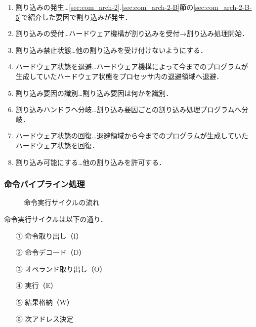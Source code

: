\begin{enumerate}[label=\arabic*., labelsep=10pt, leftmargin=23pt]
	\item 割り込みの発生…\ref{sec:com_arch-2}.\ref{sec:com_arch-2-B}節の\ref{sec:com_arch-2-B-5}で紹介した要因で割り込みが発生．
	\item 割り込みの受付…ハードウェア機構が割り込みを受付→割り込み処理開始．
	\item 割り込み禁止状態…他の割り込みを受け付けないようにする．
	\item ハードウェア状態を退避…ハードウェア機構によって今までのプログラムが生成していたハードウェア状態をプロセッサ内の退避領域へ退避．
	\item 割り込み要因の識別…割り込み要因は何かを識別．
	\item 割り込みハンドラへ分岐…割り込み要因ごとの割り込み処理プログラムへ分岐．
	\item ハードウェア状態の回復…退避領域から今までのプログラムが生成していたハードウェア状態を回復．
	\item 割り込み可能にする…他の割り込みを許可する．
\end{enumerate}



\subsubsection{命令パイプライン処理}\label{sec:com_arch-2-B-7}

\begin{figure}[H]
	\begin{center}
		\caption{命令実行サイクルの流れ}
		\label{fig:com_arch-2}
	\end{center}
\end{figure}

命令実行サイクルは以下の通り．

\begin{enumerate}[labelsep=10pt, leftmargin=23pt]
	\item[①] 命令取り出し（I）
	\item[②] 命令デコード（D）
	\item[③] オペランド取り出し（O）
	\item[④] 実行（E）
	\item[⑤] 結果格納（W）
	\item[⑥] 次アドレス決定
\end{enumerate}

